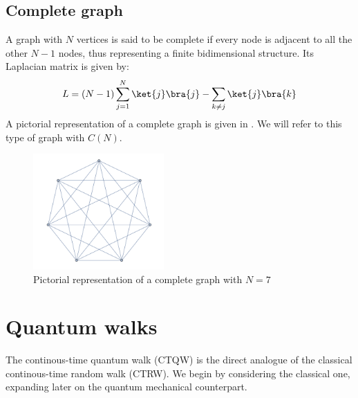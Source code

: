     \subsection{Complete graph}\label{subsec:complete graph}
        A graph with $N$ vertices is said to be complete if every node is adjacent to all the other $N-1$ nodes, thus representing a finite bidimensional structure. Its Laplacian matrix is given by:
        \begin{equation}
            L = (N-1)\sum_{j=1}^{N}\ket{j}\bra{j} - \sum_{k\neq j}\ket{j}\bra{k}
        \end{equation}
        A pictorial representation of a complete graph is given in . We will refer to this type of graph with $C(N)$.
        \begin{figure}[hb]
          \centering
          \includegraphics[width=50mm]{./figures/chapter1/complete}
          \caption[Pictorial representation of a complete graph]{Pictorial representation of a complete graph with $N=7$}
          \label{fig:complete_graph_pictorial}
        \end{figure}

\section{Quantum walks}\label{sec:quantum walks}
The continous-time quantum walk (CTQW) is the direct analogue of the classical continous-time random walk (CTRW). We begin by considering the classical one, expanding later on the quantum mechanical counterpart. \nocite{Mulken2011} \\

